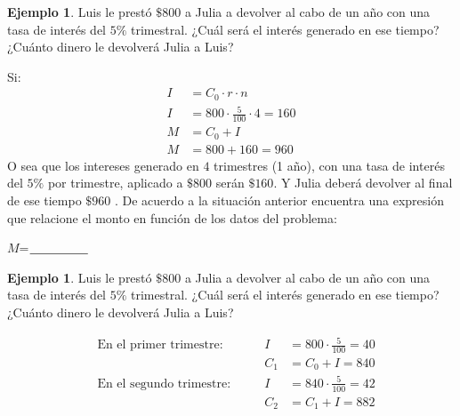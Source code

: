 \documentclass[12pt]{examdesign}
\theoremstyle{plain}
\theoremstyle{definition}
\newtheorem{exa}[theorem]{Ejemplo}
\theoremstyle{remark}
\begin{document}
\begin{endmatter}
    	\vspace{.2cm}
    	\begin{tcolorbox}[opteqC]
    		\begin{exa}
    		 Luis le prestó $\$800$ a Julia a devolver al cabo de un año con una tasa de interés del $5\%$ trimestral. ¿Cuál será el interés generado en ese tiempo? ¿Cuánto dinero le devolverá Julia a Luis?
    		\end{exa}
        \end{tcolorbox}
        Si:
        \begin{align}
        	I&=C_{0}\cdot r\cdot n\\
        	I&=800\cdot \frac{5}{100}\cdot 4=160\\
        	M&=C_{0}+I\\
        	M&=800+160=960
        \end{align}
        O sea que los intereses generado en $4$ trimestres (1 año), con una tasa de interés del $5\%$ por trimestre, aplicado a $\$800$ serán $\$160$. Y Julia deberá devolver al final de ese tiempo $\$960$
        .
        De acuerdo a la situación anterior encuentra una expresión que relacione el monto en función de los datos del problema:
        \begin{center}
        	\def\blank#1{$\underline{\mbox{\hphantom{#1}}}$}
        	$M$=\blank{woodchuck}
        \end{center}
        \vspace{.2cm}
        \begin{tcolorbox}[opteqC]
        	\begin{exa}
        		Luis le prestó $\$800$ a Julia a devolver al cabo de un año con una tasa de interés del $5\%$ trimestral. ¿Cuál será el interés generado en ese tiempo? ¿Cuánto dinero le devolverá Julia a Luis?
        	\end{exa}
        \end{tcolorbox}
        \begin{align*}
        	&\mbox{En el primer trimestre: }               &&&        I&=800\cdot\frac{5}{100}=40          \\
        	&                                              &&&      C_1&=C_{0}+I=840                       \\
        	&\mbox{En el segundo trimestre: }              &&&        I&=840\cdot \frac{5}{100}=42         \\
        	&                                              &&&      C_2&=C_{1}+I=882                       \\

\end{align*}
\end{endmatter}
\end{document}
